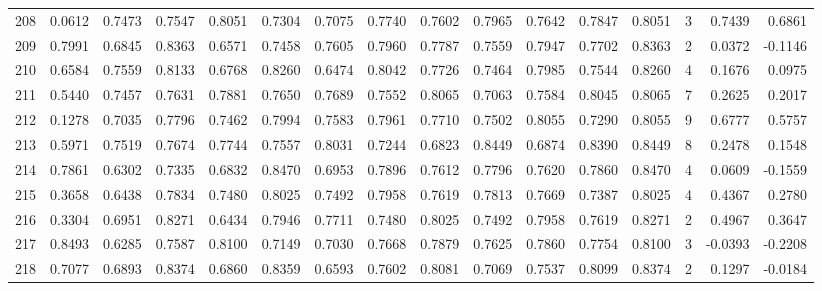 \begin{tabular}{lrrrrrrrrrrrrrrr}
208 &      0.0612 &  0.7473 &  0.7547 &  0.8051 &  0.7304 &  0.7075 &  0.7740 &  0.7602 &  0.7965 &  0.7642 &   0.7847 &     0.8051 &      3 &                    0.7439 &                     0.6861 \\
209 &      0.7991 &  0.6845 &  0.8363 &  0.6571 &  0.7458 &  0.7605 &  0.7960 &  0.7787 &  0.7559 &  0.7947 &   0.7702 &     0.8363 &      2 &                    0.0372 &                    -0.1146 \\
210 &      0.6584 &  0.7559 &  0.8133 &  0.6768 &  0.8260 &  0.6474 &  0.8042 &  0.7726 &  0.7464 &  0.7985 &   0.7544 &     0.8260 &      4 &                    0.1676 &                     0.0975 \\
211 &      0.5440 &  0.7457 &  0.7631 &  0.7881 &  0.7650 &  0.7689 &  0.7552 &  0.8065 &  0.7063 &  0.7584 &   0.8045 &     0.8065 &      7 &                    0.2625 &                     0.2017 \\
212 &      0.1278 &  0.7035 &  0.7796 &  0.7462 &  0.7994 &  0.7583 &  0.7961 &  0.7710 &  0.7502 &  0.8055 &   0.7290 &     0.8055 &      9 &                    0.6777 &                     0.5757 \\
213 &      0.5971 &  0.7519 &  0.7674 &  0.7744 &  0.7557 &  0.8031 &  0.7244 &  0.6823 &  0.8449 &  0.6874 &   0.8390 &     0.8449 &      8 &                    0.2478 &                     0.1548 \\
214 &      0.7861 &  0.6302 &  0.7335 &  0.6832 &  0.8470 &  0.6953 &  0.7896 &  0.7612 &  0.7796 &  0.7620 &   0.7860 &     0.8470 &      4 &                    0.0609 &                    -0.1559 \\
215 &      0.3658 &  0.6438 &  0.7834 &  0.7480 &  0.8025 &  0.7492 &  0.7958 &  0.7619 &  0.7813 &  0.7669 &   0.7387 &     0.8025 &      4 &                    0.4367 &                     0.2780 \\
216 &      0.3304 &  0.6951 &  0.8271 &  0.6434 &  0.7946 &  0.7711 &  0.7480 &  0.8025 &  0.7492 &  0.7958 &   0.7619 &     0.8271 &      2 &                    0.4967 &                     0.3647 \\
217 &      0.8493 &  0.6285 &  0.7587 &  0.8100 &  0.7149 &  0.7030 &  0.7668 &  0.7879 &  0.7625 &  0.7860 &   0.7754 &     0.8100 &      3 &                   -0.0393 &                    -0.2208 \\
218 &      0.7077 &  0.6893 &  0.8374 &  0.6860 &  0.8359 &  0.6593 &  0.7602 &  0.8081 &  0.7069 &  0.7537 &   0.8099 &     0.8374 &      2 &                    0.1297 &                    -0.0184 \\

\end{tabular}
